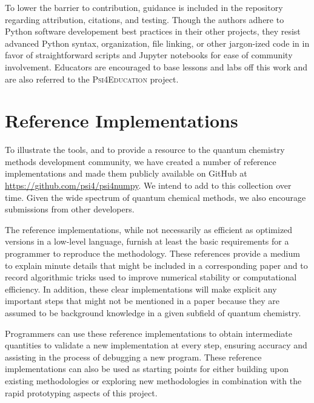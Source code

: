 \documentclass[journal=jctcce,manuscript=article]{achemso}
\newcommand{\pfn}{{\sc{Psi4NumPy}}\xspace}%
\begin{document}
To lower the barrier to contribution, guidance is included in the repository regarding attribution, citations, and testing. Though the authors adhere to Python software developement best practices in their other projects, they resist advanced Python syntax, organization, file linking, or other jargon-ized code in \pfn in favor of straightforward scripts and Jupyter notebooks for ease of community involvement.  Educators are encouraged to base lessons and labs off this work and are also referred to the \textsc{Psi4Education} project\cite{psi4edu}.


\section{Reference Implementations}

To illustrate the \pfn tools, and to provide a resource to the quantum chemistry methods development community, we have created a number of reference implementations and made them publicly available on GitHub at \url{https://github.com/psi4/psi4numpy}.  We intend to add to this collection over time.  Given the wide spectrum of quantum chemical methods, we also encourage submissions from other developers.

The \pfn reference implementations, while not necessarily as efficient as optimized versions in a low-level language, furnish at least the basic requirements for a programmer to reproduce the methodology. These references provide a medium to explain minute details that might be included in a corresponding paper and to record algorithmic tricks used to improve numerical stability or computational efficiency. In addition, these clear implementations will make explicit any important steps that might not be mentioned in a paper because they are assumed to be background knowledge in a given subfield of quantum chemistry.

Programmers can use these reference implementations to obtain intermediate quantities to validate a new implementation at every step, ensuring accuracy and assisting in the process of debugging a new program. These reference implementations can also be used as starting points for either building upon existing methodologies or exploring new methodologies in combination with the rapid prototyping aspects of this project.
\end{document}
